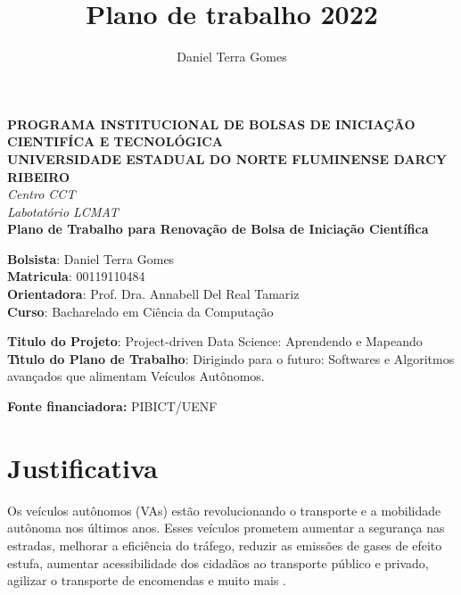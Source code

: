 \documentclass{article}
\title{Plano de trabalho 2022}
\author{Daniel Terra Gomes}
\begin{document}
\begin{titlepage}
\begin{center}
\large
\textbf{PROGRAMA INSTITUCIONAL DE BOLSAS DE INICIA\c{C}\~{A}O CIENTIF\'{I}CA E TECNOL\'{O}GICA\\\vspace{0,5cm}
UNIVERSIDADE ESTADUAL DO NORTE FLUMINENSE DARCY RIBEIRO\\
}
\textit{Centro CCT \\
Labotat\'{o}rio LCMAT\\
\vspace{1cm}}
\vspace{1,5cm}
\textbf{Plano de Trabalho para Renovação de Bolsa de Iniciação Científica}\\\vspace{5cm}
\end{center}
\textbf{Bolsista}: Daniel Terra Gomes\\
\textbf{Matricula}: 00119110484\\
\textbf{Orientadora}: Prof. Dra. Annabell Del Real Tamariz  \\
\textbf{Curso}: Bacharelado em Ci\^{e}ncia da Computa\c{c}\~{a}o\\
\vspace{3cm}
\begin{center}
\textbf{Titulo do Projeto}: Project-driven Data Science: Aprendendo e Mapeando\\
\textbf{T\'{\i}tulo do Plano de Trabalho}: Dirigindo para o futuro: Softwares e Algoritmos avançados que alimentam Veículos Autônomos.

\textbf{Fonte financiadora:} PIBICT/UENF
\end{center}
\end{titlepage}


\section{Justificativa}

Os veículos autônomos (VAs) estão revolucionando o transporte e a mobilidade autônoma nos últimos anos. Esses veículos prometem aumentar a segurança nas estradas, melhorar a eficiência do tráfego, reduzir as emissões de gases de efeito estufa, aumentar acessibilidade dos cidadãos ao transporte público e privado, agilizar o transporte de encomendas e muito mais \cite{review-auto, intro-pm, mundobrasil}.
\end{document}
